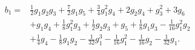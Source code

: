 \begin{align}
 b_1={}&\tfrac{1}{2}g_1g_2g_3+\tfrac{7}{2}g_1g_5+\tfrac{3}{4}g_1^2g_4+2g_2g_4+g_3^2+3g_6\nonumber\\
 &+g_1g_4+\tfrac{1}{8}g_1^2g_3+\tfrac{1}{2}g_2g_3+g_5+\tfrac{1}{8}g_1g_3-\tfrac{1}{16}g_1^2g_2\nonumber\\
 &+\tfrac{1}{4}g_4-\tfrac{1}{8}g_1g_2-\tfrac{1}{32}g_1^3-\tfrac{1}{16}g_1^2-\tfrac{1}{16}g_2-\tfrac{1}{32}g_1.
 \label{eq:b1}
\end{align}
